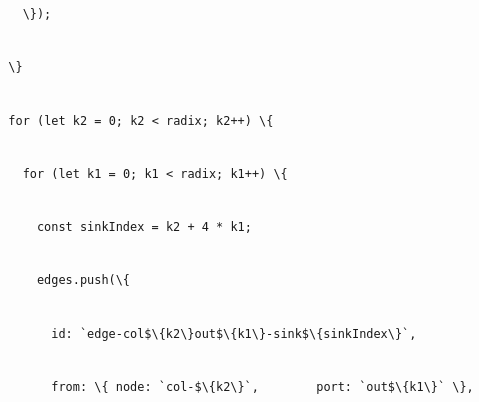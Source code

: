 \documentclass[
]{article}
\newcommand{\passthrough}[1]{#1}
\begin{document}
\passthrough{\lstinline!    !}\passthrough{\lstinline!\});!}\strut \\
\passthrough{\lstinline!  !}\passthrough{\lstinline!\}!}\strut \\
\passthrough{\lstinline!  !}\passthrough{\lstinline!for!}\passthrough{\lstinline! !}\passthrough{\lstinline!(let!}\passthrough{\lstinline! !}\passthrough{\lstinline!k2!}\passthrough{\lstinline! !}\passthrough{\lstinline!=!}\passthrough{\lstinline! !}\passthrough{\lstinline!0;!}\passthrough{\lstinline! !}\passthrough{\lstinline!k2!}\passthrough{\lstinline! !}\passthrough{\lstinline!<!}\passthrough{\lstinline! !}\passthrough{\lstinline!radix;!}\passthrough{\lstinline! !}\passthrough{\lstinline!k2++)!}\passthrough{\lstinline! !}\passthrough{\lstinline!\{!}\strut \\
\passthrough{\lstinline!    !}\passthrough{\lstinline!for!}\passthrough{\lstinline! !}\passthrough{\lstinline!(let!}\passthrough{\lstinline! !}\passthrough{\lstinline!k1!}\passthrough{\lstinline! !}\passthrough{\lstinline!=!}\passthrough{\lstinline! !}\passthrough{\lstinline!0;!}\passthrough{\lstinline! !}\passthrough{\lstinline!k1!}\passthrough{\lstinline! !}\passthrough{\lstinline!<!}\passthrough{\lstinline! !}\passthrough{\lstinline!radix;!}\passthrough{\lstinline! !}\passthrough{\lstinline!k1++)!}\passthrough{\lstinline! !}\passthrough{\lstinline!\{!}\strut \\
\passthrough{\lstinline!      !}\passthrough{\lstinline!const!}\passthrough{\lstinline! !}\passthrough{\lstinline!sinkIndex!}\passthrough{\lstinline! !}\passthrough{\lstinline!=!}\passthrough{\lstinline! !}\passthrough{\lstinline!k2!}\passthrough{\lstinline! !}\passthrough{\lstinline!+!}\passthrough{\lstinline! !}\passthrough{\lstinline!4!}\passthrough{\lstinline! !}\passthrough{\lstinline!*!}\passthrough{\lstinline! !}\passthrough{\lstinline!k1;!}\strut \\
\passthrough{\lstinline!      !}\passthrough{\lstinline!edges.push!}\passthrough{\lstinline!(\{!}\strut \\
\passthrough{\lstinline!        !}\passthrough{\lstinline!id:!}\passthrough{\lstinline! !}\passthrough{\lstinline!`edge-col$\{k2\}out$\{k1\}-sink$\{!}\passthrough{\lstinline!sinkIndex!}\passthrough{\lstinline!\}`,!}\strut \\
\passthrough{\lstinline!        !}\passthrough{\lstinline!from:!}\passthrough{\lstinline! !}\passthrough{\lstinline!\{!}\passthrough{\lstinline! !}\passthrough{\lstinline!node:!}\passthrough{\lstinline! !}\passthrough{\lstinline!`col-$\{k2\}`,!}\passthrough{\lstinline!        !}\passthrough{\lstinline!port:!}\passthrough{\lstinline! !}\passthrough{\lstinline!`out$\{k1\}`!}\passthrough{\lstinline! !}\passthrough{\lstinline!\},!}\strut \\
\end{document}
